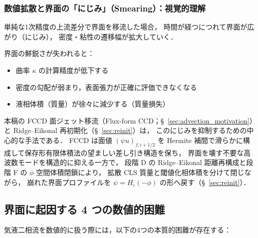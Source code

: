 \subsubsection{数値拡散と界面の「にじみ」（Smearing）：視覚的理解}

単純な1次精度の上流差分で界面を移流した場合，
時間が経つにつれて界面が広がり（にじみ），
密度・粘性の遷移幅が拡大していく．

界面の鮮鋭さが失われると：
\begin{itemize}
  \item 曲率 $\kappa$ の計算精度が低下する
  \item 密度の勾配が弱まり，表面張力が正確に評価できなくなる
  \item 液相体積（質量）が徐々に減少する（質量損失）
\end{itemize}

本稿の FCCD 面ジェット移流（Flux-form CCD；§~\ref{sec:advection_motivation}）と
Ridge--Eikonal 再初期化（§~\ref{sec:reinit}）は，
このにじみを抑制するための中心的な手法である．
FCCD は面値 $(\psi u)_{f,i+1/2}$ を Hermite 補間で滑らかに構成して保存形有限体積法の望ましい差し引き構造を保ち，
界面を壊す不要な高波数モードを構造的に抑える一方で，
段階 D の Ridge--Eikonal 距離再構成と段階 F の $\phi$ 空間体積閉鎖により，
拡散 CLS 質量と閾値化相体積を分けて閉じながら，
崩れた界面プロファイルを $\psi = H_\varepsilon(-\phi)$ の形へ戻す（§~\ref{sec:reinit}）．

\subsection{界面に起因する 4 つの数値的困難}
\label{sec:challenges}

気液二相流を数値的に扱う際には，以下の4つの本質的困難が存在する：

